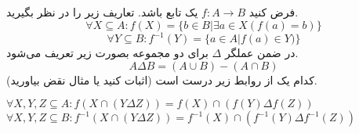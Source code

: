 فرض کنید $f:A\rightarrow B$ یک تابع باشد. تعاریف زیر را در نظر بگیرید.
$$\forall X \subseteq A: f(X)=\{b \in B| \exists a \in X (f(a)=b)\}$$
$$\forall Y \subseteq B: f^{-1}(Y)=\{a \in A| f(a) \in Y)\}$$
در ضمن عملگر $\Delta$ برای دو مجموعه بصورت زیر تعریف می‌شود.
$$A\Delta B=(A\cup B)-(A\cap B)$$
کدام یک از روابط زیر درست است (اثبات کنید یا مثال نقض بیاورید).

$\forall X,Y, Z \subseteq A: f(X \cap (Y \Delta Z))=f(X) \cap (f(Y) \Delta f(Z))$
$\forall X, Y, Z \subseteq B: f^{-1}(X \cap (Y \Delta Z))=f^{-1}(X) \cap (f^{-1}(Y) \Delta f^{-1}(Z))$
